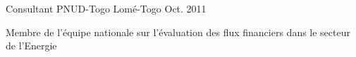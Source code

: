 \begin{cventries}
  \cventry
    {Consultant} %
    {PNUD-Togo} %
    {Lomé-Togo} %
    {Oct. 2011} %
    {
      \begin{cvitems} %
        \item {Membre de l’équipe nationale sur l’évaluation des flux financiers dans le secteur de l'Energie}
      \end{cvitems}
    }

\end{cventries}
